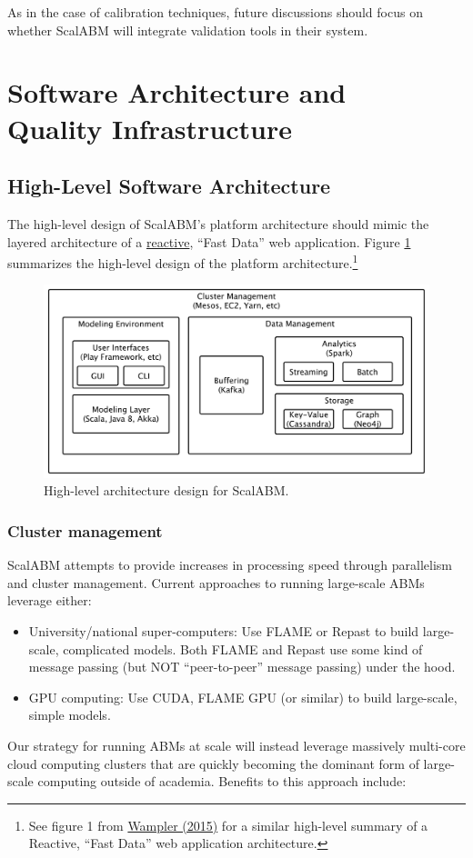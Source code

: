 \documentclass[a4paper]{article}
\begin{document}
As in the case of calibration techniques, future discussions should focus on whether ScalABM will integrate validation tools in their system.

\section{Software Architecture and \\ Quality Infrastructure}

\subsection{High-Level Software Architecture}

The high-level design of ScalABM's platform architecture should mimic the layered architecture of a \href{http://www.reactivemanifesto.org/}{reactive}, ``Fast Data'' web application. Figure \ref{fig:architecture} summarizes the high-level design of the platform architecture.\footnote{
See figure 1 from \href{./fast-data-big-data-evolved.pdf}{Wampler (2015)} for a similar high-level summary of a Reactive, ``Fast Data'' web application architecture.}

\begin{figure}
\centering
\includegraphics[width=12cm]{img/coarse-grain-schema-2.pdf}
\caption{High-level architecture design for ScalABM.}
\label{fig:architecture}
\end{figure}

\subsubsection{Cluster management} 
ScalABM attempts to provide increases in processing speed through parallelism and cluster management. Current approaches to running large-scale ABMs leverage either:
\begin{itemize}
    \item University/national super-computers: Use FLAME or Repast to build large-scale, complicated models. Both FLAME and Repast use some kind of message passing (but NOT ``peer-to-peer'' message passing) under the hood.
    \item GPU computing: Use CUDA, FLAME GPU (or similar) to build large-scale, simple models.
\end{itemize}
Our strategy for running ABMs at scale will instead leverage massively multi-core cloud computing clusters that are quickly becoming the dominant form of large-scale computing outside of academia. Benefits to this approach include:
\end{document}
